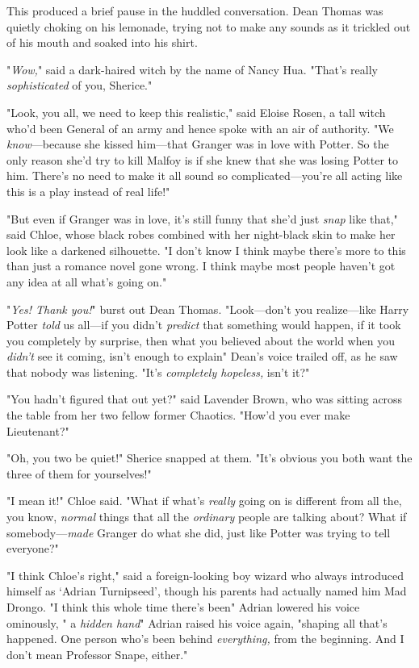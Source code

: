 This produced a brief pause in the huddled conversation. Dean Thomas was
quietly choking on his lemonade, trying not to make any sounds as it trickled
out of his mouth and soaked into his shirt.

"\emph{Wow,}" said a dark-haired witch by the name of Nancy Hua. "That's
really{\el} \emph{sophisticated} of you, Sherice."

"Look, you all, we need to keep this realistic," said Eloise Rosen, a tall
witch who'd been General of an army and hence spoke with an air of authority.
"We \emph{know}—because she kissed him—that Granger was in love with
Potter. So the only reason she'd try to kill Malfoy is if she knew that she was
losing Potter to him. There's no need to make it all sound so
complicated—you're all acting like this is a play instead of real life!"

"But even if Granger was in love, it's still funny that she'd just \emph{snap}
like that," said Chloe, whose black robes combined with her night-black skin to
make her look like a darkened silhouette. "I don't know{\el} I think maybe
there's more to this than just a romance novel gone wrong. I think maybe most
people haven't got any idea at all what's going on."

"\emph{Yes! Thank you!}" burst out Dean Thomas. "Look—don't you
realize—like Harry Potter \emph{told} us all—if you didn't \emph{predict}
that something would happen, if it took you completely by surprise, then what
you believed about the world when you \emph{didn't} see it coming, isn't enough
to explain{\el}" Dean's voice trailed off, as he saw that nobody was
listening. "It's \emph{completely hopeless,} isn't it?"

"You hadn't figured that out yet?" said Lavender Brown, who was sitting across
the table from her two fellow former Chaotics. "How'd you ever make Lieutenant?"

"Oh, you two be quiet!" Sherice snapped at them. "It's obvious you both want
the three of them for yourselves!"

"I mean it!" Chloe said. "What if what's \emph{really} going on is different
from all the, you know, \emph{normal} things that all the \emph{ordinary}
people are talking about? What if somebody—\emph{made} Granger do what she
did, just like Potter was trying to tell everyone?"

"I think Chloe's right," said a foreign-looking boy wizard who always
introduced himself as `Adrian Turnipseed', though his parents had actually
named him Mad Drongo. "I think this whole time there's been{\el}" Adrian
lowered his voice ominously, "{\el} a \emph{hidden hand}{\el}" Adrian
raised his voice again, "shaping all that's happened. One person who's been
behind \emph{everything,} from the beginning. And I don't mean Professor Snape,
either."

